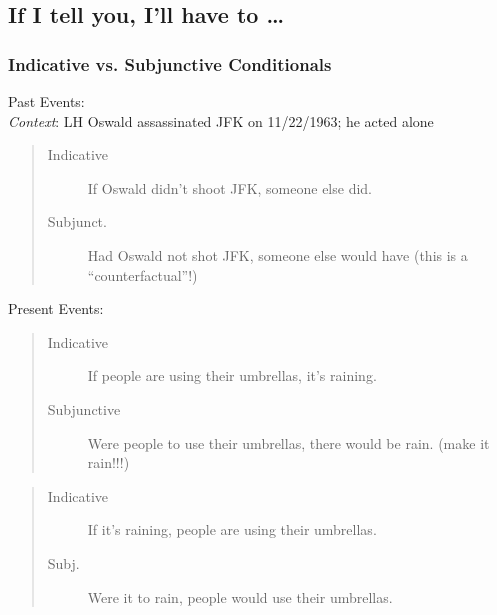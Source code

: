 \subsection{If I tell you, I'll have to \dots}

\begin{frame}
\frametitle{Indicative vs. Subjunctive Conditionals}

Past Events: \\ \textit{Context}: LH Oswald assassinated JFK on 11/22/1963; he acted alone 
\pause
\begin{quote}
\begin{description}
\item[Indicative] If Oswald didn't shoot JFK, someone else did. \pause
\item[Subjunct.] Had Oswald not shot JFK, someone else would have (this is a ``counterfactual''!) \pause
\end{description}
\end{quote}

Present Events:
\begin{quote}
\begin{description}
\item[Indicative] If people are using their umbrellas, it's raining.\pause
\item[Subjunctive] Were people to use their umbrellas, there would be rain. (make it rain!!!)\pause


\end{description}
\end{quote}



\begin{quote}
\begin{description}
\item[Indicative] If it's raining, people are using their umbrellas.\pause

\item[Subj.] Were it to rain, people would use their umbrellas.

\end{description}
\end{quote}
\end{frame}

